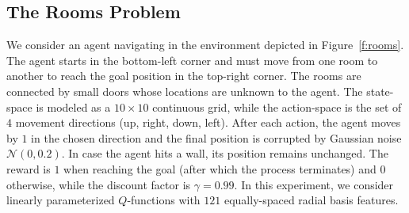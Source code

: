 \documentclass{article}
\begin{document}
\subsection{The Rooms Problem} \label{sec:gw}

We consider an agent navigating in the environment depicted in Figure~\ref{f:rooms}. The agent starts in the bottom-left corner and must move from one room to another to reach the goal position in the top-right corner. The rooms are connected by small doors whose locations are unknown to the agent. The state-space is modeled as a $10 \times 10$ continuous grid, while the action-space is the set of $4$ movement directions (up, right, down, left). After each action, the agent moves by $1$ in the chosen direction and the final position is corrupted by Gaussian noise $\mathcal{N}(0,0.2)$. In case the agent hits a wall, its position remains unchanged. The reward is $1$ when reaching the goal (after which the process terminates) and $0$ otherwise, while the discount factor is $\gamma = 0.99$. In this experiment, we consider linearly parameterized $Q$-functions with $121$ equally-spaced radial basis features.

\end{document}
